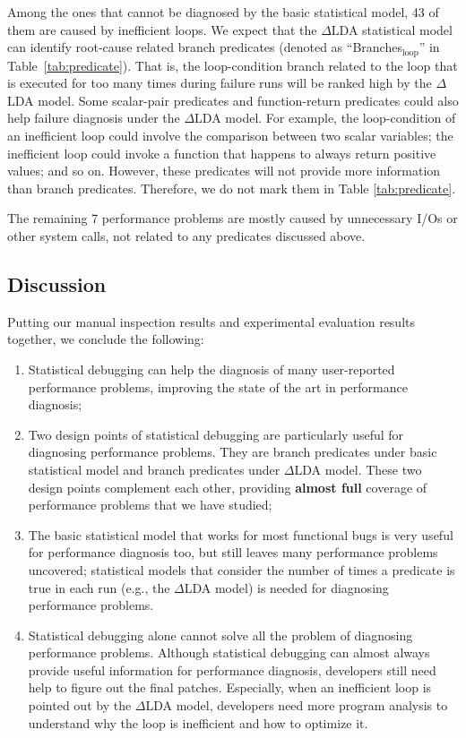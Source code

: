 Among the ones that cannot be diagnosed by the basic statistical model,
43 of them are caused by inefficient loops. We expect that the 
$\Delta$LDA statistical model can identify root-cause related branch predicates
(denoted as ``Branches$_{\text{loop}}$'' in Table~\ref{tab:predicate}).
That is, the loop-condition branch related to the loop that is executed for too
many times
during failure runs will be ranked high by the $\Delta$LDA model.
Some scalar-pair predicates and function-return predicates could also
help failure diagnosis under the $\Delta$LDA model. For example, the
loop-condition of an inefficient loop could involve the comparison between
two scalar variables; the inefficient loop could invoke a function that
happens to always return positive values; and so on. However, these predicates
will not provide more information than branch predicates. Therefore, we do
not mark them in Table \ref{tab:predicate}.

The remaining 7 performance problems are mostly caused by unnecessary I/Os
or other system calls, not related to any predicates discussed above.

\subsection{Discussion}

Putting our manual inspection results and
experimental evaluation results together, we conclude the following:

\begin{enumerate}
\item Statistical debugging can help the diagnosis of many
user-reported performance problems, improving the state of the art in 
performance diagnosis;

\item Two design points of statistical debugging are particularly useful
for diagnosing performance problems. They are branch predicates under
basic statistical model and branch predicates under $\Delta$LDA model.
These two design points complement each other, providing
\textbf{almost full} coverage of performance problems that we have studied;

\item The basic statistical model that works for most functional bugs
\cite{liblit03,liblit05,tarantula1,tarantula2,tarantula.darko,CCI,joy.asplos13}
is very useful for performance diagnosis too, but still leaves many performance
problems uncovered; statistical models that
consider the number of times a predicate is true 
in each run (e.g., the $\Delta$LDA model)
is needed for diagnosing performance problems.

\item Statistical debugging alone cannot solve all the problem
of diagnosing performance problems. Although statistical debugging
can almost always provide useful information for performance diagnosis, 
developers still
need help to figure out the final patches. Especially, when an inefficient
loop is pointed out by the $\Delta$LDA model, 
developers need more program analysis to understand why the loop is inefficient
and how to optimize it.
\end{enumerate}



